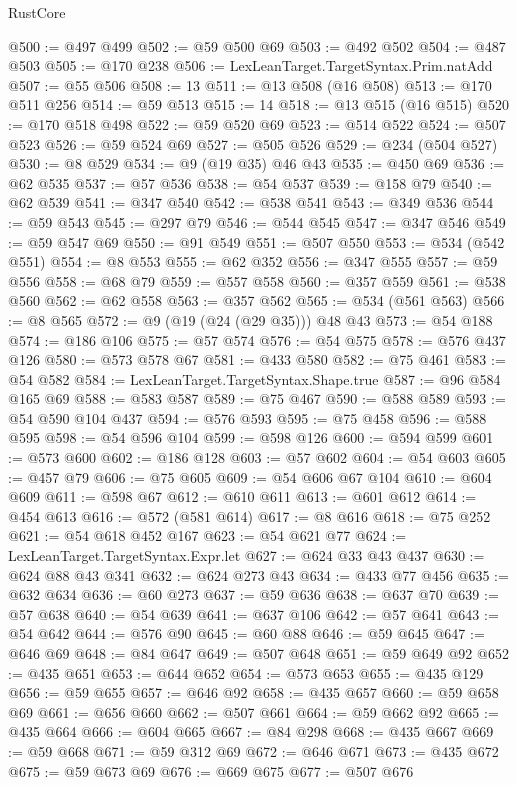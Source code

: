 \begin{lexlean}{RustCore}
\begin{coremodule}
@500 := @497 @499
@502 := @59 @500 @69
@503 := @492 @502
@504 := @487 @503
@505 := @170 @238
@506 := LexLeanTarget.TargetSyntax.Prim.natAdd
@507 := @55 @506
@508 := 13
@511 := @13 @508 (@16 @508)
@513 := @170 @511 @256
@514 := @59 @513
@515 := 14
@518 := @13 @515 (@16 @515)
@520 := @170 @518 @498
@522 := @59 @520 @69
@523 := @514 @522
@524 := @507 @523
@526 := @59 @524 @69
@527 := @505 @526
@529 := @234 (@504 @527)
@530 := @8 @529
@534 := @9 (@19 @35) @46 @43
@535 := @450 @69
@536 := @62 @535
@537 := @57 @536
@538 := @54 @537
@539 := @158 @79
@540 := @62 @539
@541 := @347 @540
@542 := @538 @541
@543 := @349 @536
@544 := @59 @543
@545 := @297 @79
@546 := @544 @545
@547 := @347 @546
@549 := @59 @547 @69
@550 := @91 @549
@551 := @507 @550
@553 := @534 (@542 @551)
@554 := @8 @553
@555 := @62 @352
@556 := @347 @555
@557 := @59 @556
@558 := @68 @79
@559 := @557 @558
@560 := @357 @559
@561 := @538 @560
@562 := @62 @558
@563 := @357 @562
@565 := @534 (@561 @563)
@566 := @8 @565
@572 := @9 (@19 (@24 (@29 @35))) @48 @43
@573 := @54 @188
@574 := @186 @106
@575 := @57 @574
@576 := @54 @575
@578 := @576 @437 @126
@580 := @573 @578 @67
@581 := @433 @580
@582 := @75 @461
@583 := @54 @582
@584 := LexLeanTarget.TargetSyntax.Shape.true
@587 := @96 @584 @165 @69
@588 := @583 @587
@589 := @75 @467
@590 := @588 @589
@593 := @54 @590 @104 @437
@594 := @576 @593
@595 := @75 @458
@596 := @588 @595
@598 := @54 @596 @104
@599 := @598 @126
@600 := @594 @599
@601 := @573 @600
@602 := @186 @128
@603 := @57 @602
@604 := @54 @603
@605 := @457 @79
@606 := @75 @605
@609 := @54 @606 @67 @104
@610 := @604 @609
@611 := @598 @67
@612 := @610 @611
@613 := @601 @612
@614 := @454 @613
@616 := @572 (@581 @614)
@617 := @8 @616
@618 := @75 @252
@621 := @54 @618 @452 @167
@623 := @54 @621 @77
@624 := LexLeanTarget.TargetSyntax.Expr.let
@627 := @624 @33 @43 @437
@630 := @624 @88 @43 @341
@632 := @624 @273 @43
@634 := @433 @77 @456
@635 := @632 @634
@636 := @60 @273
@637 := @59 @636
@638 := @637 @70
@639 := @57 @638
@640 := @54 @639
@641 := @637 @106
@642 := @57 @641
@643 := @54 @642
@644 := @576 @90
@645 := @60 @88
@646 := @59 @645
@647 := @646 @69
@648 := @84 @647
@649 := @507 @648
@651 := @59 @649 @92
@652 := @435 @651
@653 := @644 @652
@654 := @573 @653
@655 := @435 @129
@656 := @59 @655
@657 := @646 @92
@658 := @435 @657
@660 := @59 @658 @69
@661 := @656 @660
@662 := @507 @661
@664 := @59 @662 @92
@665 := @435 @664
@666 := @604 @665
@667 := @84 @298
@668 := @435 @667
@669 := @59 @668
@671 := @59 @312 @69
@672 := @646 @671
@673 := @435 @672
@675 := @59 @673 @69
@676 := @669 @675
@677 := @507 @676

\end{coremodule}
\end{lexlean}

